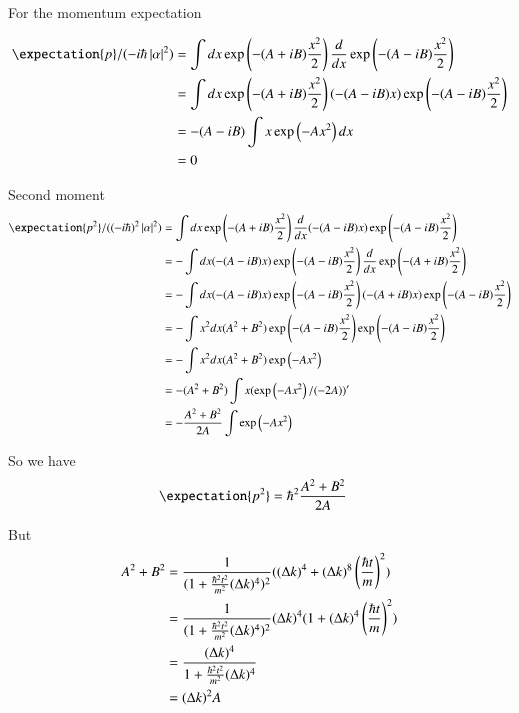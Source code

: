 For the momentum expectation

\begin{align*}
\expectation{p}/(-i\hbar\Abs{\alpha}^2) 
&= \int dx
\exp\left( -(A + iB) \frac{x^2}{2} \right) 
\frac{d}{dx}
\exp\left( -(A - iB) \frac{x^2}{2} \right)  \\
&= \int dx
\exp\left( -(A + iB) \frac{x^2}{2} \right) 
(-(A -iB)x)
\exp\left( -(A - iB) \frac{x^2}{2} \right)  \\
&= 
-(A -iB)
\int x \exp\left( -A x^2 \right) dx
\\
&= 0
\end{align*}

Second moment
\begin{align*}
\expectation{p^2}/((-i\hbar)^2\Abs{\alpha}^2) 
&= \int dx
\exp\left( -(A + iB) \frac{x^2}{2} \right) 
\frac{d}{dx}
(-(A -iB)x) \exp\left( -(A - iB) \frac{x^2}{2} \right)  \\
&= -\int dx
(-(A -iB)x) \exp\left( -(A - iB) \frac{x^2}{2} \right)  
\frac{d}{dx}
\exp\left( -(A + iB) \frac{x^2}{2} \right) 
\\
&= -\int dx
(-(A -iB)x) \exp\left( -(A - iB) \frac{x^2}{2} \right) 
(-(A +iB)x) \exp\left( -(A - iB) \frac{x^2}{2} \right)  \\
&= -\int x^2 dx
(A^2 + B^2) \exp\left( -(A - iB) \frac{x^2}{2} \right) 
\exp\left( -(A - iB) \frac{x^2}{2} \right)  \\
&= -\int x^2 dx (A^2 + B^2) \exp\left( -A x^2 \right) \\
&= - (A^2 + B^2) \int x (\exp\left( -A x^2 \right)/(-2A))' \\
&= -\frac{A^2 + B^2}{2A} \int \exp\left( -A x^2 \right) \\
\end{align*}

So we have
\begin{align*}
\expectation{p^2} &= \hbar^2 \frac{A^2 + B^2}{2A} 
\end{align*}

But 
\begin{align*}
A^2 + B^2 
&= 
\frac{1}{(1 + \frac{\hbar^2 t^2}{m^2}(\Delta k)^4)^2} ((\Delta k)^4 + (\Delta k)^8 \left(\frac{\hbar t}{m}\right)^2 ) \\
&= 
\frac{1}{(1 + \frac{\hbar^2 t^2}{m^2}(\Delta k)^4)^2} (\Delta k)^4(1 + (\Delta k)^4 \left(\frac{\hbar t}{m}\right)^2 ) \\
&= 
\frac{(\Delta k)^4}{1 + \frac{\hbar^2 t^2}{m^2}(\Delta k)^4} \\
&= (\Delta k)^2 A
\end{align*}

